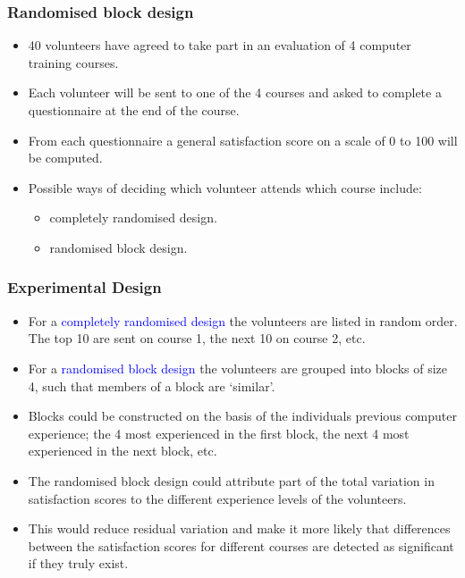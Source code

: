 \documentclass[12pt,xcolor=dvipsnames,handout,mathserif,aspectratio=169]{beamer}
\newcommand{\tc}{\textcolor}
\begin{document}
\begin{frame}
\frametitle{Randomised block design}
\begin{itemize}
\item 40 volunteers have agreed to take part in an evaluation of 4 computer training courses.
\vspace*{0.3cm}
\item Each volunteer will be sent to one of the 4 courses and asked to complete a questionnaire at
the end of the course.
\vspace*{0.3cm}
\item From each questionnaire a general satisfaction score on a scale of 0 to 100 will be computed.
\vspace*{0.3cm}
\item Possible ways of deciding which volunteer attends which course include:
\vspace{0.2cm}
\begin{itemize}
\item completely randomised design.
\vspace{0.2cm}
\item randomised block design.
\end{itemize}
\end{itemize}
\end{frame}


\begin{frame}
\frametitle{Experimental Design}
\begin{itemize}
\item For a \tc{blue}{completely randomised design} the volunteers are listed in random order. The top
10 are sent on course 1, the next 10 on course 2, etc.
\vspace*{0.3cm}
\item For a \tc{blue}{randomised block design} the volunteers are grouped into blocks of size 4, such that members of a block are `similar'. 
\vspace{0.3cm}
\item Blocks could be constructed on the basis of the individuals previous computer experience;
the 4 most experienced in the first block, the next 4 most experienced in the next block, etc.
\vspace*{0.2cm}
\item The randomised block design could attribute part of the total variation in satisfaction
scores to the different experience levels of the volunteers. 
\vspace{0.2cm}
\item This would reduce residual variation and make it more likely that differences between the satisfaction scores for different courses
are detected as significant if they truly exist.
\end{itemize}
\end{frame}
\end{document}
